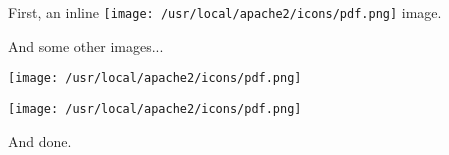 \documentclass[letterpaper]{article}
\begin{document}
First, an inline
\texttt{[image: /usr/local/apache2/icons/pdf.png]}
image.

And some other images...

\texttt{[image: /usr/local/apache2/icons/pdf.png]}

\texttt{[image: /usr/local/apache2/icons/pdf.png]}

And done.
\end{document}
